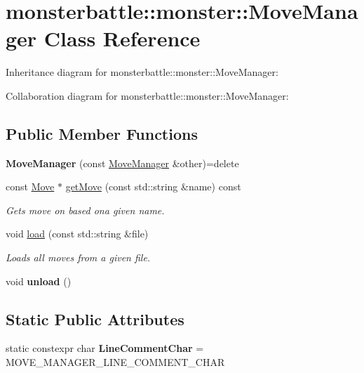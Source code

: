 \hypertarget{classmonsterbattle_1_1monster_1_1MoveManager}{}\section{monsterbattle\+:\+:monster\+:\+:Move\+Manager Class Reference}
\label{classmonsterbattle_1_1monster_1_1MoveManager}


Inheritance diagram for monsterbattle\+:\+:monster\+:\+:Move\+Manager\+:


Collaboration diagram for monsterbattle\+:\+:monster\+:\+:Move\+Manager\+:
\subsection*{Public Member Functions}
\begin{DoxyCompactItemize}
\item 
\mbox{\label{classmonsterbattle_1_1monster_1_1MoveManager_afbed4d9e1813a855ff88cc4fde6c9af7}} 
{\bfseries Move\+Manager} (const \hyperlink{classmonsterbattle_1_1monster_1_1MoveManager}{Move\+Manager} \&other)=delete
\item 
const \hyperlink{classmonsterbattle_1_1monster_1_1Move}{Move} $\ast$ \hyperlink{classmonsterbattle_1_1monster_1_1MoveManager_a9f4afb738df41bba6c75af2234c4ec17}{get\+Move} (const std\+::string \&name) const
\begin{DoxyCompactList}\small\item\em Gets move on based ona given name. \end{DoxyCompactList}\item 
void \hyperlink{classmonsterbattle_1_1monster_1_1MoveManager_a977b4425970b87bb0350a7d862755b50}{load} (const std\+::string \&file)
\begin{DoxyCompactList}\small\item\em Loads all moves from a given file. \end{DoxyCompactList}\item 
\mbox{\label{classmonsterbattle_1_1monster_1_1MoveManager_a815464077246cbd5c55f2f562fd7b44d}} 
void {\bfseries unload} ()
\end{DoxyCompactItemize}
\subsection*{Static Public Attributes}
\begin{DoxyCompactItemize}
\item 
\mbox{\label{classmonsterbattle_1_1monster_1_1MoveManager_a9b3bd5217db30e13659ce1391af8a082}} 
static constexpr char {\bfseries Line\+Comment\+Char} = M\+O\+V\+E\+\_\+\+M\+A\+N\+A\+G\+E\+R\+\_\+\+L\+I\+N\+E\+\_\+\+C\+O\+M\+M\+E\+N\+T\+\_\+\+C\+H\+AR
\end{DoxyCompactItemize}
